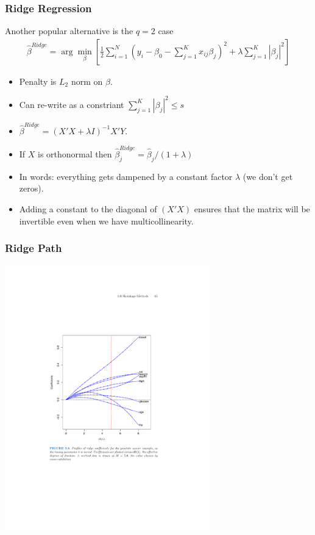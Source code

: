 \documentclass[xcolor=pdftex,dvipsnames,table,mathserif,aspectratio=169]{beamer}
\begin{document}
\begin{frame}
\frametitle{Ridge Regression}
Another popular alternative is the $q=2$ case
\begin{eqnarray*}
\hat{\beta}^{Ridge} = \arg \min_{\beta} \left[\frac{1}{2} \sum_{i=1}^N (y_i - \beta_0 - \sum_{j=1}^K x_{ij} \beta_j)^2 + \lambda \sum_{j=1}^K | \beta_j|^2 \right]
\end{eqnarray*}
\begin{itemize}
\item Penalty is $L_2$ norm on $\beta$.
\item Can re-write as a constriant  $\sum_{j=1}^K | \beta_j|^2 \leq s$
\item $\hat{\beta}^{Ridge} = (X'X + \lambda I )^{-1} X' Y$.
\item If $X$ is orthonormal then $\hat{\beta}_{j}^{Ridge} =  \hat{\beta}_j /(1 +\lambda )$
\item In words: everything gets dampened by a constant factor $\lambda$ (we don't get zeros).
\item Adding a constant to the diagonal of $(X'X)$ ensures that the matrix will be invertible even when we have multicollinearity.
\end{itemize}
\end{frame}

\begin{frame}
\frametitle{Ridge Path}
\begin{center}
\includegraphics[width=3.5in]{./resources/ridgepath}
\end{center}
\end{frame}
\end{document}
